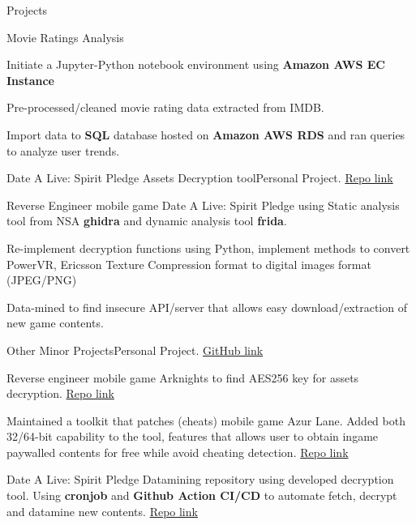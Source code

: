 \begin{rSection}{Projects}
    \begin{rSubsection}{Movie Ratings Analysis}{}{}{}
        \item Initiate a Jupyter-Python notebook environment using \textbf{Amazon AWS EC Instance}
        \item Pre-processed/cleaned movie rating data extracted from IMDB.
        \item Import data to \textbf{SQL} database hosted on \textbf{Amazon AWS RDS} and ran queries to analyze user trends.
    \end{rSubsection}

\begin{SWE}
    \begin{rSubsection}{Date A Live: Spirit Pledge Assets Decryption tool}{}{Personal Project. \href{https://github.com/n0k0m3/DALSP-Assets-Decryption-tool}{Repo link}}{}
        \item Reverse Engineer mobile game Date A Live: Spirit Pledge using Static analysis tool from NSA \textbf{ghidra} and dynamic analysis tool \textbf{frida}.
        \item Re-implement decryption functions using Python, implement methods to convert PowerVR, Ericsson Texture Compression format to digital images format (JPEG/PNG)
        \item Data-mined to find insecure API/server that allows easy download/extraction of new game contents.
    \end{rSubsection}
    \begin{rSubsection}{Other Minor Projects}{}{Personal Project. \href{https://github.com/n0k0m3}{GitHub link}}{}
        \item Reverse engineer mobile game Arknights to find AES256 key for assets decryption. \href{https://github.com/n0k0m3/Arknights-Lua-Decrypter}{Repo link}
        \item Maintained a toolkit that patches (cheats) mobile game Azur Lane. Added both 32/64-bit capability to the tool, features that allows user to obtain ingame paywalled contents for free while avoid cheating detection. \href{https://github.com/n0k0m3/Azur-Lane-Scripts-Autopatcher}{Repo link}
        \item Date A Live: Spirit Pledge Datamining repository using developed decryption tool. Using \textbf{cronjob} and \textbf{Github Action CI/CD} to automate fetch, decrypt and datamine new contents. \href{https://github.com/n0k0m3/DateALiveData}{Repo link}
    \end{rSubsection}
\end{SWE}

\end{rSection}